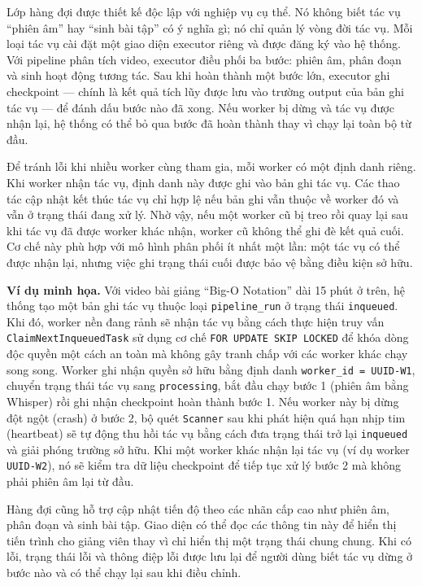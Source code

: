 \documentclass[../DoAn.tex]{subfiles}
\begin{document}
Lớp hàng đợi được thiết kế độc lập với nghiệp vụ cụ thể. Nó không biết tác vụ ``phiên âm'' hay ``sinh bài tập'' có ý nghĩa gì; nó chỉ quản lý vòng đời tác vụ. Mỗi loại tác vụ cài đặt một giao diện executor riêng và được đăng ký vào hệ thống. Với pipeline phân tích video, executor điều phối ba bước: phiên âm, phân đoạn và sinh hoạt động tương tác. Sau khi hoàn thành một bước lớn, executor ghi checkpoint --- chính là kết quả tích lũy được lưu vào trường output của bản ghi tác vụ --- để đánh dấu bước nào đã xong. Nếu worker bị dừng và tác vụ được nhận lại, hệ thống có thể bỏ qua bước đã hoàn thành thay vì chạy lại toàn bộ từ đầu.

Để tránh lỗi khi nhiều worker cùng tham gia, mỗi worker có một định danh riêng. Khi worker nhận tác vụ, định danh này được ghi vào bản ghi tác vụ. Các thao tác cập nhật kết thúc tác vụ chỉ hợp lệ nếu bản ghi vẫn thuộc về worker đó và vẫn ở trạng thái đang xử lý. Nhờ vậy, nếu một worker cũ bị treo rồi quay lại sau khi tác vụ đã được worker khác nhận, worker cũ không thể ghi đè kết quả cuối. Cơ chế này phù hợp với mô hình phân phối ít nhất một lần: một tác vụ có thể được nhận lại, nhưng việc ghi trạng thái cuối được bảo vệ bằng điều kiện sở hữu.

\textbf{Ví dụ minh họa.} Với video bài giảng ``Big-O Notation'' dài 15 phút ở trên, hệ thống tạo một bản ghi tác vụ thuộc loại \texttt{pipeline\_run} ở trạng thái \texttt{inqueued}. Khi đó, worker nền đang rảnh sẽ nhận tác vụ bằng cách thực hiện truy vấn \texttt{ClaimNextInqueuedTask} sử dụng cơ chế \texttt{FOR UPDATE SKIP LOCKED} để khóa dòng độc quyền một cách an toàn mà không gây tranh chấp với các worker khác chạy song song. Worker ghi nhận quyền sở hữu bằng định danh \texttt{worker\_id = UUID-W1}, chuyển trạng thái tác vụ sang \texttt{processing}, bắt đầu chạy bước 1 (phiên âm bằng Whisper) rồi ghi nhận checkpoint hoàn thành bước 1. Nếu worker này bị dừng đột ngột (crash) ở bước 2, bộ quét \texttt{Scanner} sau khi phát hiện quá hạn nhịp tim (heartbeat) sẽ tự động thu hồi tác vụ bằng cách đưa trạng thái trở lại \texttt{inqueued} và giải phóng trường sở hữu. Khi một worker khác nhận lại tác vụ (ví dụ worker \texttt{UUID-W2}), nó sẽ kiểm tra dữ liệu checkpoint để tiếp tục xử lý bước 2 mà không phải phiên âm lại từ đầu.

Hàng đợi cũng hỗ trợ cập nhật tiến độ theo các nhãn cấp cao như phiên âm, phân đoạn và sinh bài tập. Giao diện có thể đọc các thông tin này để hiển thị tiến trình cho giảng viên thay vì chỉ hiển thị một trạng thái chung chung. Khi có lỗi, trạng thái lỗi và thông điệp lỗi được lưu lại để người dùng biết tác vụ dừng ở bước nào và có thể chạy lại sau khi điều chỉnh.
\end{document}
